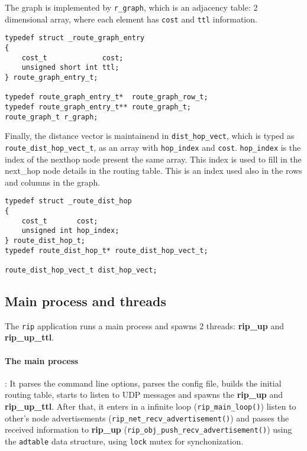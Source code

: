 \documentclass[10pt]{extarticle}
\begin{document}
\newpage
The graph is implemented by \texttt{r\_graph}, which is an adjacency table: 
2 dimensional array, where each element has \texttt{cost} and \texttt{ttl} information.

\begin{lstlisting}
typedef struct _route_graph_entry
{
    cost_t             cost;
    unsigned short int ttl;
} route_graph_entry_t;

typedef route_graph_entry_t*  route_graph_row_t;
typedef route_graph_entry_t** route_graph_t;
route_graph_t r_graph;
\end{lstlisting}

Finally, the  distance vector is maintainend  in \texttt{dist\_hop\_vect}, which
is   typed    as   \texttt{route\_dist\_hop\_vect\_t},   as   an    array   with
\texttt{hop\_index}  and \texttt{cost}.  \texttt{hop\_index} is  the index  of the
nexthop node present the same array. This  index is used to fill in the next\_hop
node details in  the routing table. This is  an index used also in  the rows and
columns in the graph.

\begin{lstlisting}
typedef struct _route_dist_hop
{
    cost_t       cost;
    unsigned int hop_index;
} route_dist_hop_t;
typedef route_dist_hop_t* route_dist_hop_vect_t;

route_dist_hop_vect_t dist_hop_vect;
\end{lstlisting}

\subsection{Main process and threads}

The \texttt{rip} application runs a main process and spawns 2 threads:
\textbf{rip\_up} and \textbf{rip\_up\_ttl}.

\paragraph{The main  process}: It  parses the command  line options,  parses the
config file, builds the initial routing  table, starts to listen to UDP messages
and spawns the \textbf{rip\_up} and \textbf{rip\_up\_ttl}. After that, it enters
in  a   infinite  loop  (\texttt{rip\_main\_loop()})  listen   to  other's  node
advertisements   (\texttt{rip\_net\_recv\_advertisement()})   and   passes   the
received              information               to              \textbf{rip\_up}
(\texttt{rip\_obj\_push\_recv\_advertisement()}) using the \texttt{adtable} data
structure, using \texttt{lock} mutex for synchonization.
\end{document}
